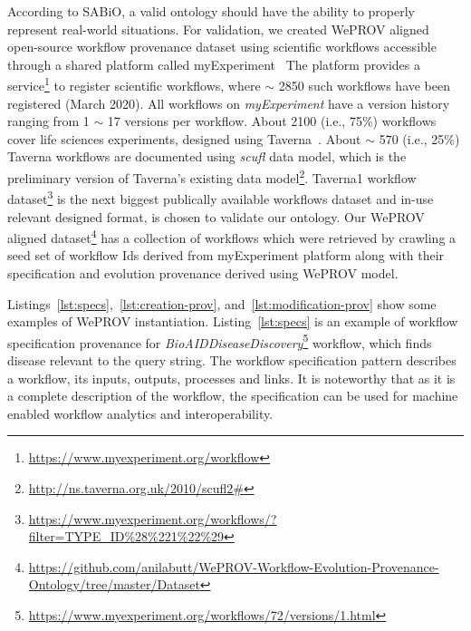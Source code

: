 \documentclass[ao]{iosart2x}
\begin{document}
According to SABiO, a valid ontology should have the ability to properly represent real-world situations. 
For validation, we created WePROV aligned open-source workflow provenance dataset using scientific workflows accessible through a shared platform called myExperiment~\citep{de2009design}
The platform provides a service\footnote{\url{https://www.myexperiment.org/workflow}} to register scientific workflows, where $\sim$ 2850 such workflows have been registered (March 2020). All workflows on \textit{myExperiment} have a version history ranging from 1 $\sim$ 17 versions per workflow. About 2100 (i.e., 75\%) workflows cover life sciences experiments, designed using Taverna~\citep{hull2006taverna}. About $\sim$ 570 (i.e., 25\%) Taverna workflows are documented using \textit{scufl} data model, which is the preliminary version of Taverna's existing data model\footnote{\url{http://ns.taverna.org.uk/2010/scufl2\#}}. Taverna1 workflow dataset\footnote{\url{https://www.myexperiment.org/workflows/?filter=TYPE_ID\%28\%221\%22\%29}} is the next biggest publically available workflows dataset and in-use relevant designed format, is chosen to validate our ontology. Our WePROV aligned dataset\footnote{\url{https://github.com/anilabutt/WePROV-Workflow-Evolution-Provenance-Ontology/tree/master/Dataset}} has a collection of workflows which were retrieved by crawling a seed set of workflow Ids derived from myExperiment platform along with their specification and evolution provenance derived using WePROV model.

Listings~\ref{lst:specs},~\ref{lst:creation-prov}, and~\ref{lst:modification-prov} show some examples of WePROV instantiation. 
Listing~\ref{lst:specs} is an example of workflow specification provenance for \textit{BioAIDDiseaseDiscovery}\footnote{\url{https://www.myexperiment.org/workflows/72/versions/1.html}} workflow, which finds disease relevant to the query string. The workflow specification pattern describes a workflow, its inputs, outputs, processes and links. It is noteworthy that as it is a complete description of the workflow, the specification can be used for machine enabled workflow analytics and interoperability.  
\end{document}
